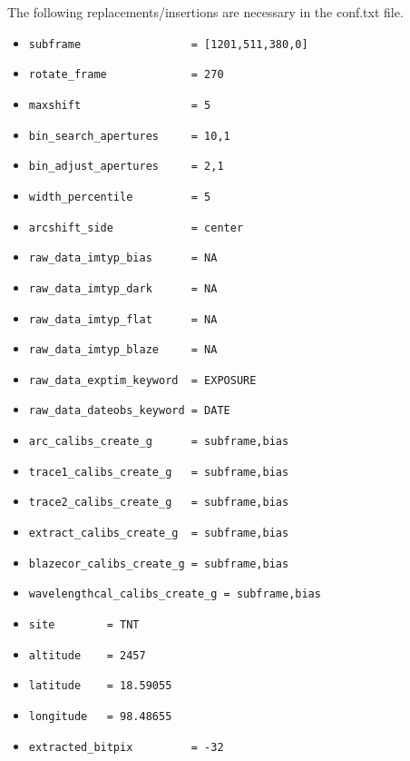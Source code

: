 \documentclass[10pt,a4paper]{article}
\begin{document}
\noindent The following replacements/insertions are necessary in the conf.txt file. 
\begin{itemize}\small\setlength\itemsep{-0.1cm}
  \item \verb|subframe                 = [1201,511,380,0]|
  \item \verb|rotate_frame             = 270|
  \item \verb|maxshift                 = 5|
  \item \verb|bin_search_apertures     = 10,1|
  \item \verb|bin_adjust_apertures     = 2,1|
  \item \verb|width_percentile         = 5|
  \item \verb|arcshift_side            = center|
  \item \verb|raw_data_imtyp_bias      = NA|
  \item \verb|raw_data_imtyp_dark      = NA|
  \item \verb|raw_data_imtyp_flat      = NA|
  \item \verb|raw_data_imtyp_blaze     = NA|
  \item \verb|raw_data_exptim_keyword  = EXPOSURE|
  \item \verb|raw_data_dateobs_keyword = DATE|
  \item \verb|arc_calibs_create_g      = subframe,bias|
  \item \verb|trace1_calibs_create_g   = subframe,bias|
  \item \verb|trace2_calibs_create_g   = subframe,bias|
  \item \verb|extract_calibs_create_g  = subframe,bias|
  \item \verb|blazecor_calibs_create_g = subframe,bias|
  \item \verb|wavelengthcal_calibs_create_g = subframe,bias|
  \item \verb|site        = TNT|
  \item \verb|altitude    = 2457|
  \item \verb|latitude    = 18.59055|
  \item \verb|longitude   = 98.48655|
  \item \verb|extracted_bitpix         = -32|
\end{itemize}




\newpage
\end{document}

